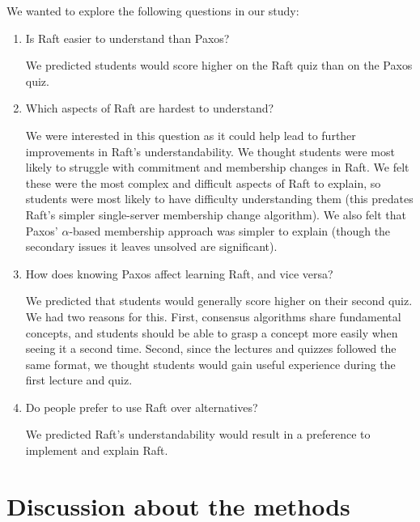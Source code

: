 We wanted to explore the following questions in our study:
\begin{enumerate}

\item Is Raft easier to understand than Paxos?

We predicted students would score higher on the Raft quiz than on the
Paxos quiz.

\item Which aspects of Raft are hardest to understand?

We were interested in this question as it could help lead to further
improvements in Raft's understandability.
We thought students were most likely to struggle with commitment and
membership changes in Raft. We felt these were the most complex and
difficult aspects of Raft to explain, so students were most likely to
have difficulty understanding them
(this predates Raft's simpler single-server membership change
algorithm). We also felt that Paxos'
$\alpha$-based membership approach was simpler to explain (though the
secondary issues it leaves unsolved are significant).

\item How does knowing Paxos affect learning Raft, and vice versa?

We predicted that students would generally score higher on their second
quiz. We had two reasons for this. First, consensus algorithms share
fundamental concepts, and students should be able to grasp a concept
more easily when seeing it a second time. Second, since the lectures and
quizzes followed the same format, we thought students would gain useful
experience during the first lecture and quiz.

\item Do people prefer to use Raft over alternatives?

We predicted Raft's understandability would result in a preference to
implement and explain Raft.

\end{enumerate}


\section{Discussion about the methods}
\label{userstudy:methodsdiscussion}

%

